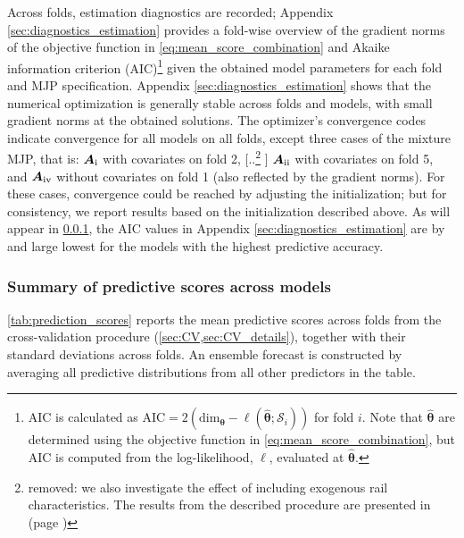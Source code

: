 \documentclass{article}
\newcommand{\RN}[1]{\textup{\uppercase\expandafter{\romannumeral#1}}}
\providecommand{\DIFadd}[1]{{\protect\color{blue} \sf #1}} %
\providecommand{\DIFdel}[1]{{\protect\color{red} [..\footnote{removed: #1} ]}} %
\providecommand{\DIFaddbegin}{} %
\providecommand{\DIFaddend}{} %
\providecommand{\DIFdelbegin}{} %
\providecommand{\DIFdelend}{} %
\begin{document}
\DIFadd{Across folds, estimation diagnostics are recorded; Appendix \ref{sec:diagnostics_estimation} provides a fold-wise overview of the gradient norms of the objective function in \cref{eq:mean_score_combination} and Akaike information criterion (AIC)}\footnote{\DIFadd{AIC is calculated as $\text{AIC} = 2 (\text{dim}_{\bm \theta} - \ell (\widehat{\bm \theta}  ; \mathcal{S}_i) )$ for fold $i$. Note that $\widehat{\bm \theta}$ are determined using the objective function in \cref{eq:mean_score_combination}, but AIC is computed from the log-likelihood, $\ell$, evaluated at $\widehat{\bm\theta}$.}} \DIFadd{given the obtained model parameters for each fold and MJP specification.
Appendix \ref{sec:diagnostics_estimation} shows that the numerical optimization is generally stable across folds and models, with small gradient norms at the obtained solutions. The optimizer’s convergence codes indicate convergence for all models on all folds, except three cases of the mixture MJP, that is: \(\bm{A}_{\RN{1}}\) with covariates on fold 2}\DIFaddend , \DIFdelbegin \DIFdel{we also investigate the effect of including exogenous rail characteristics. The results from the described procedure are presented in \Cref{tab:forecast_error_tab} (page \pageref{tab:forecast_error_tab})}\DIFdelend \DIFaddbegin \DIFadd{\(\bm{A}_{\RN{2}}\) with covariates on fold 5, and \(\bm{A}_{\RN{4}}\) without covariates on fold 1 (also reflected by the gradient norms). For these cases, convergence could be reached by adjusting the initialization; but for consistency, we report results based on the initialization described above. As will appear in \cref{sec:prediction_scores_tables}, the AIC values in Appendix \ref{sec:diagnostics_estimation} are by and large lowest for the models with the highest predictive accuracy.
}

\subsubsection{\DIFadd{Summary of predictive scores across models}} \label{sec:prediction_scores_tables}
\DIFadd{\cref{tab:prediction_scores} reports the mean predictive scores across folds from the cross-validation procedure (\cref{sec:CV,sec:CV_details}), together with their standard deviations across folds}\DIFaddend .
An ensemble forecast is constructed by averaging all predictive distributions from all other predictors in the table.
\end{document}
